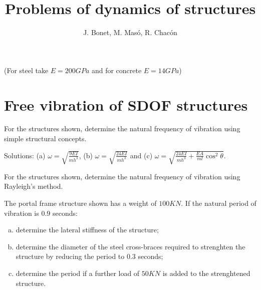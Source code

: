 \documentclass{problems}
\title{Problems of dynamics of structures}
\author{J. Bonet, M. Masó, R. Chacón}
\begin{document}
\maketitle

(For steel take $E=200GPa$ and for concrete $E=14GPa$)

\section{Free vibration of SDOF structures}

For the structures shown, determine the natural frequency of vibration using simple structural concepts.

\begin{center}
    \hspace{2em}
    \hspace{2em}
\end{center}

Solutions: (a) $\omega = \sqrt{\frac{9EI}{mh^3}}$, (b) $\omega = \sqrt{\frac{24EI}{mh^3}}$ and (c) $\omega = \sqrt{\frac{24EI}{mh^3}+\frac{EA}{ml}\cos^2\theta}$.

For the structures shown, determine the natural frequency of vibration using Rayleigh's method.

\begin{center}
\end{center}

\begin{center}
\end{center}


The portal frame structure shown has a weight of $100KN$. If the natural period of vibration is 0.9 seconds:
\begin{enumerate}[(a)]
    \item determine the lateral stiffness of the structure;
    \item determine the diameter of the steel cross-braces required to strenghten the structure by reducing the period to 0.3 seconds;
    \item determine the period if a further load of $50KN$ is added to the strenghtened structure.
\end{enumerate}

\begin{center}
\end{center}
\end{document}
